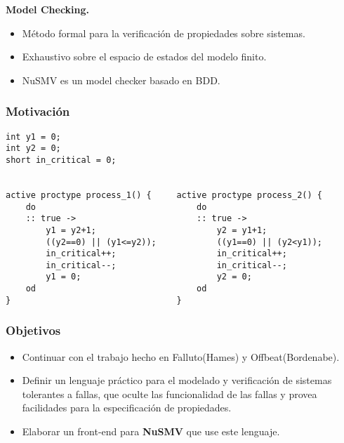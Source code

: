 \documentclass[serif]{beamer}
\begin{document}
\begin{frame}
{\Large \bfseries Model Checking.}
\begin{itemize}\itemsep15pt
\item Método formal para la verificación de propiedades sobre sistemas.
\item Exhaustivo sobre el espacio de estados del modelo finito.
\item NuSMV es un model checker basado en BDD.
\end{itemize}
\end{frame}


\begin{frame}[fragile]
\frametitle{Motivación}
{\fontsize{9pt}{11pt}\selectfont
\begin{verbatim}
int y1 = 0;
int y2 = 0;
short in_critical = 0;


active proctype process_1() {     active proctype process_2() {
    do                                do
    :: true ->                        :: true ->
        y1 = y2+1;                        y2 = y1+1;
        ((y2==0) || (y1<=y2));            ((y1==0) || (y2<y1));
        in_critical++;                    in_critical++;
        in_critical--;                    in_critical--;
        y1 = 0;                           y2 = 0;
    od                                od
}                                 }
\end{verbatim}
}
\end{frame}

\begin{frame}
\frametitle{Objetivos}
\begin{itemize}\itemsep15pt
\item Continuar con el trabajo hecho en Falluto(Hames) y Offbeat(Bordenabe). 
\item Definir un lenguaje práctico para el modelado y verificación de 
sistemas tolerantes a fallas, que oculte las funcionalidad de las 
fallas y provea facilidades para la especificación de propiedades.
\item Elaborar un front-end para \textbf{NuSMV} que use este lenguaje.
\end{itemize}
\end{frame}
\end{document}
